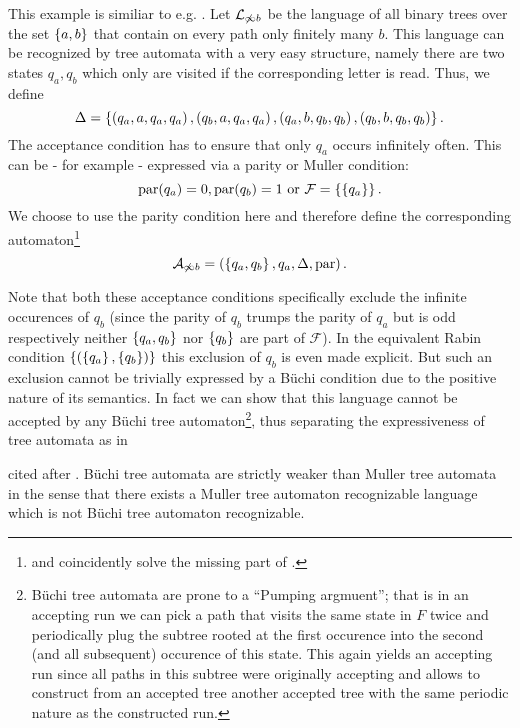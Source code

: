 \begin{example}
  This example is similiar to e.g.
  \cite[Exercise 8.3 and the proof of Theorem 8.6]{AutoLogInfGames}.
  Let $\mathcal{L}_{\not\infty b}$ be the language of all binary trees over the
  set $\left\{a,b\right\}$ that contain on every path only finitely many $b$. This
  language can be recognized by tree automata with a very easy structure,
  namely there are two states $q_{a}, q_{b}$ which only are visited if the
  corresponding letter is read. Thus, we define
  \begin{equation*}
    \Delta = \left\{
      \left(q_{a}, a, q_{a}, q_{a}\right),
      \left(q_{b}, a, q_{a}, q_{a}\right),
      \left(q_{a}, b, q_{b}, q_{b}\right),
      \left(q_{b}, b, q_{b}, q_{b}\right)
    \right\}.
  \end{equation*}
  The acceptance condition has to ensure that only $q_{a}$ occurs infinitely
  often. This can be - for example - expressed via a parity or Muller condition:
  \begin{equation*}
    \operatorname{par}(q_{a}) = 0, \operatorname{par}(q_{b}) = 1\text{ or }
    \mathcal{F} = \left\{\left\{q_{a}\right\}\right\}.
  \end{equation*}
  We choose to use the parity condition here and therefore define the
  corresponding automaton\footnote{and coincidently solve the missing part of
  \cite[Exercise 8.3]{AutoLogInfGames}.}
  \begin{equation*}
    \mathcal{A}_{\not\infty b} = \left(\left\{q_{a}, q_{b}\right\}, q_{a}, \Delta,
    \operatorname{par}\right).
  \end{equation*}
\end{example}
Note that both these acceptance conditions specifically exclude the infinite
occurences of $q_{b}$ (since the parity of $q_{b}$ trumps the parity of
$q_{a}$ but is odd respectively neither $\left\{q_{a}, q_{b}\right\}$ nor
$\left\{q_{b}\right\}$ are part of $\mathcal{F}$). In the equivalent Rabin
condition $\left\{\left(\left\{q_{a}\right\}, \left\{q_{b}\right\}\right)\right\}$ this exclusion of $q_{b}$
is even made explicit. But such an exclusion cannot be trivially expressed by a
Büchi condition due to the positive nature of its semantics. In fact we can
show that this language cannot be accepted by any Büchi tree
automaton\footnote{Büchi tree automata are prone to a
\enquote{Pumping argmuent}; that is in an accepting run we can pick a path that
visits the same state in $F$ twice and periodically plug the subtree rooted at
the first occurence into the second (and all subsequent) occurence of this
state. This again yields an accepting run since all paths in this subtree were
originally accepting and allows to construct from an accepted tree another
accepted tree with the same periodic nature as the constructed run.}, thus
separating the expressiveness of tree automata as in
\begin{theorem}
  \cite[Corollary 8]{WeakDefRel} cited after
  \cite[Theorem 8.6]{AutoLogInfGames}.
  Büchi tree automata are strictly weaker than Muller tree automata in the
  sense that there exists a Muller tree automaton recognizable language which
  is not Büchi tree automaton recognizable.
\end{theorem}


